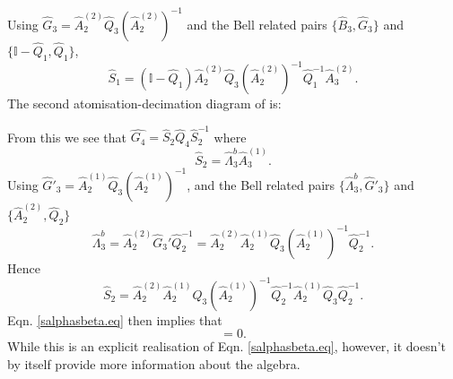 \documentclass[11pt]{article}
\newcommand{\hA}{\hat { A}}
\newcommand{\hQ}{\hat Q}
\newcommand*{\drawprobarrow}[4][]{%
  \draw[prob arrow] (#2)-- node[sloped,midway, below, #1] {$#3$} (#4);
}
\newcommand{\id}{\mathbb I}
\newcommand{\h}{\hat}
\begin{document}
 Using $\h G_3= \h A_2^{(2)}\hQ_3(\h A_2^{(2)})^{-1}$ and the Bell
 related pairs $\{\h B_3, \h G_3\}$ and  $\{\id -\hQ_1, \h Q_1\}$, 
\begin{equation}
  \h S_1= (\id -\h Q_1 ) \h A_2^{(2)}\hQ_3(\h
  A_2^{(2)})^{-1}\hQ_1^{-1}\h A_3^{(2)}.
\end{equation} 
The second atomisation-decimation diagram of  is: 
\begin{figure}[H]
\centering
\end{figure}
From this we see that  $\h{G_4}=\h S_2 \h Q_4\h S_2^{-1}$ where
\begin{equation}
  \h S_2=\h  \Lambda_3^b\h A_3^{(1)}.
\end{equation}
Using $\h G'_3=\hA_2^{(1)}\hQ_3 (\hA_2^{(1)})^{-1}$,
and the Bell related pairs $\{ \h  \Lambda_3^b, \h G'_3\}$ and $\{ \h
A_2^{(2)}, \h Q_2\}$ 
\begin{equation} 
\h \Lambda_3^b= \h A_2^{(2)}\h G_3'\h Q_2^{-1} = \h
A_2^{(2)}\h A_2^{(1)}\h Q_3 (\hA_2^{(1)})^{-1}\h Q_2^{-1}. 
\end{equation}
Hence
\begin{equation} 
\h S_2=  \hA_2^{(2)}\hA_2^{(1)}\h Q_3 (\hA_2^{(1)})^{-1}\h Q_2^{-1} \h
A_2^{(1)}\hQ_3\hQ_2^{-1}.
\end{equation} 
Eqn. \eqref{salphasbeta.eq} then implies that
\begin{equation} [\h S_2^{-1}\h
  S_1,\hQ_4]=0. \label{sonestwo.eq} 
  \end{equation} 
While this is an explicit  realisation of Eqn. \eqref{salphasbeta.eq},
however, it doesn't by itself provide more information about the
algebra. 
\end{document}
